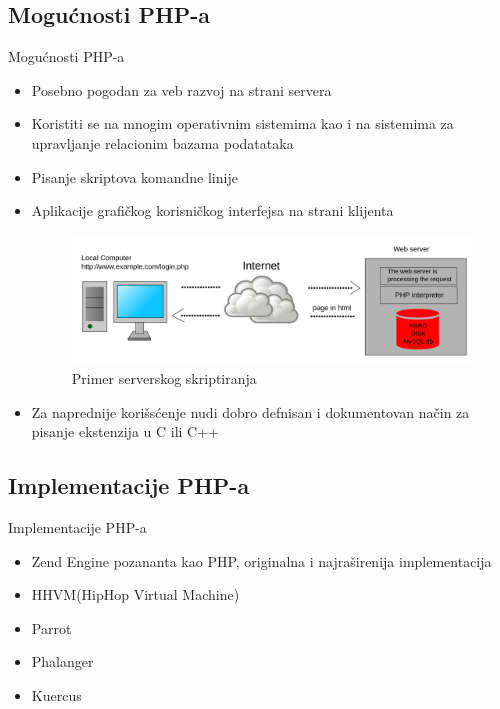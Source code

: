 \documentclass{beamer}
\begin{document}
\subsection{Mogućnosti PHP-a}
\begin{frame}{Mogućnosti PHP-a}
    	\begin{itemize}
		\item Posebno pogodan za veb razvoj na strani servera
		\item Koristiti se na mnogim operativnim sistemima kao i na sistemima za upravljanje relacionim bazama podatataka		
		\item Pisanje skriptova komandne linije
		\item Aplikacije grafičkog korisničkog interfejsa na strani klijenta
		
		\begin{figure}[h!]
                \begin{center}
                \includegraphics[scale=0.10]{primer_serverskog_skriptiranja.png}
                \end{center}
                \caption{Primer serverskog skriptiranja}
                \label{fig:primer_serverskog_skriptiranja}
                \end{figure}
		
		\item Za naprednije korišsćenje nudi dobro defnisan i dokumentovan način za pisanje ekstenzija u C ili C++
	\end{itemize}	
\end{frame}

\subsection{Implementacije PHP-a}
\begin{frame}{Implementacije PHP-a}
    	\begin{itemize}
		\item Zend Engine pozananta kao PHP, originalna i najraširenija implementacija   
		\item HHVM(HipHop Virtual Machine) 
		\item Parrot
		\item Phalanger	
		\item Kuercus
	\end{itemize}				
\end{frame}
\end{document}

